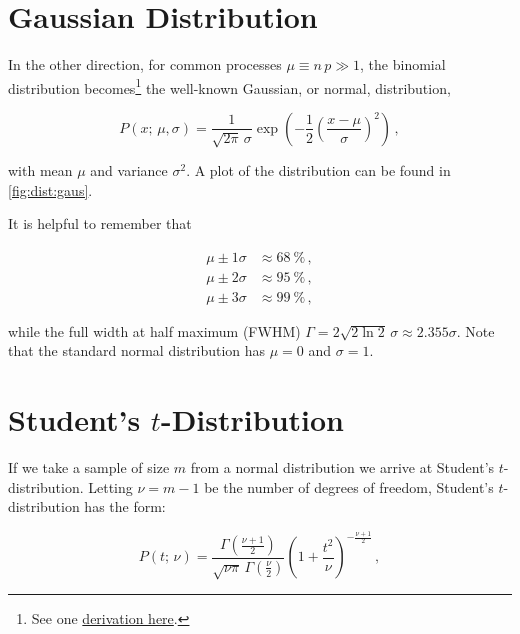 \section{Gaussian Distribution}
\label{stats:gaus}

In the other direction, for common processes $\mu \equiv n\,p \gg 1$,
the binomial distribution becomes\footnote{See
one \href{http://scipp.ucsc.edu/~haber/ph116C/NormalApprox.pdf}{derivation here}.} the
well-known Gaussian, or normal, distribution,

\begin{equation}\label{eq:stats:gaus:P}
P\left(x;\,\mu,\sigma\right) = \frac{1}{\sqrt{2\pi}\,\sigma} \exp\left( -\frac{1}{2} \left(\frac{x-\mu}{\sigma}\right)^{2} \right)\,,
\end{equation}

\noindent with mean $\mu$ and variance $\sigma^{2}$.
A plot of the distribution can be found in \cref{fig:dist:gaus}.

It is helpful to remember that

\begin{equation}\label{eq:stats:gaus:sigmas}
\begin{split}
\mu \pm 1\sigma &\approx \SI{68}{\percent}\,, \\
\mu \pm 2\sigma &\approx \SI{95}{\percent}\,, \\
\mu \pm 3\sigma &\approx \SI{99}{\percent}\,,
\end{split}
\end{equation}

\noindent while the full width at half maximum (FWHM) $\Gamma = 2\sqrt{2 \ln{2}}\,\sigma \approx \num{2.355} \sigma$.
Note that the standard normal distribution has $\mu = 0$ and $\sigma =1$.

\section{Student's \texorpdfstring{$t$}{t}-Distribution}
\label{stats:t_dist}

If we take a sample of size $m$ from a normal distribution
we arrive at Student's $t$-distribution.
Letting $\nu = m-1$ be the number of degrees of freedom,
Student's $t$-distribution has the form:

\begin{equation}\label{eq:stats:t_dist:P}
P\left(t;\,\nu\right) = \frac{
\Gamma\left(\frac{\nu+1}{2}\right)
}{
\sqrt{\nu \pi}\,\Gamma\left(\frac{\nu}{2}\right)
} \left(1+\frac{t^{2}}{\nu}\right)^{-\frac{\nu+1}{2}}\,,
\end{equation}

